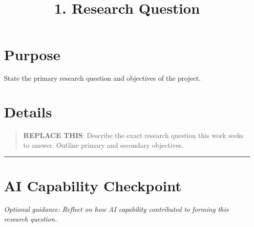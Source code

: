 \documentclass[
]{report}
\title{1. Research Question}
\author{}
\date{}
\renewcommand*\contentsname{Table of contents}
\newcommand\contentsname{Table of contents}
\begin{document}
\maketitle

\renewcommand*\contentsname{Table of contents}
{
\hypersetup{linkcolor=}
\setcounter{tocdepth}{2}
\tableofcontents
}

\chapter{Purpose}\label{purpose}

State the primary research question and objectives of the project.

\chapter{Details}\label{details}

\begin{quote}
\textbf{REPLACE THIS}: Describe the exact research question this work
seeks to answer. Outline primary and secondary objectives.
\end{quote}

\begin{center}\rule{0.5\linewidth}{0.5pt}\end{center}

\chapter{AI Capability Checkpoint}\label{ai-capability-checkpoint}

\emph{Optional guidance: Reflect on how AI capability contributed to
forming this research question.}
\end{document}
